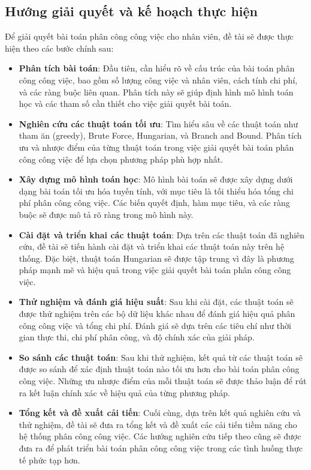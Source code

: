 \subsection{Hướng giải quyết và kế hoạch thực hiện}
Để giải quyết bài toán phân công công việc cho nhân viên, đề tài sẽ được thực hiện theo các bước chính sau:
\begin{itemize} 
    \item \textbf{Phân tích bài toán}: Đầu tiên, cần hiểu rõ về cấu trúc của bài toán phân công công việc, bao gồm số lượng công việc và nhân viên, cách tính chi phí, và các ràng buộc liên quan. Phân tích này sẽ giúp định hình mô hình toán học và các tham số cần thiết cho việc giải quyết bài toán.
     
    \item \textbf{Nghiên cứu các thuật toán tối ưu}: Tìm hiểu sâu về các thuật toán như tham ăn (greedy), Brute Force, Hungarian, và Branch and Bound. Phân tích ưu và nhược điểm của từng thuật toán trong việc giải quyết bài toán phân công công việc để lựa chọn phương pháp phù hợp nhất.

    \item \textbf{Xây dựng mô hình toán học}: Mô hình bài toán sẽ được xây dựng dưới dạng bài toán tối ưu hóa tuyến tính, với mục tiêu là tối thiểu hóa tổng chi phí phân công công việc. Các biến quyết định, hàm mục tiêu, và các ràng buộc sẽ được mô tả rõ ràng trong mô hình này.
    
    \item \textbf{Cài đặt và triển khai các thuật toán}: Dựa trên các thuật toán đã nghiên cứu, đề tài sẽ tiến hành cài đặt và triển khai các thuật toán này trên hệ thống. Đặc biệt, thuật toán Hungarian sẽ được tập trung vì đây là phương pháp mạnh mẽ và hiệu quả trong việc giải quyết bài toán phân công công việc.
    
    \item \textbf{Thử nghiệm và đánh giá hiệu suất}: Sau khi cài đặt, các thuật toán sẽ được thử nghiệm trên các bộ dữ liệu khác nhau để đánh giá hiệu quả phân công công việc và tổng chi phí. Đánh giá sẽ dựa trên các tiêu chí như thời gian thực thi, chi phí phân công, và độ chính xác của giải pháp.
    
    \item \textbf{So sánh các thuật toán}: Sau khi thử nghiệm, kết quả từ các thuật toán sẽ được so sánh để xác định thuật toán nào tối ưu hơn cho bài toán phân công công việc. Những ưu nhược điểm của mỗi thuật toán sẽ được thảo luận để rút ra kết luận chính xác về hiệu quả của từng phương pháp.
    
    \item \textbf{Tổng kết và đề xuất cải tiến}: Cuối cùng, dựa trên kết quả nghiên cứu và thử nghiệm, đề tài sẽ đưa ra tổng kết và đề xuất các cải tiến tiềm năng cho hệ thống phân công công việc. Các hướng nghiên cứu tiếp theo cũng sẽ được đưa ra để phát triển bài toán phân công công việc trong các tình huống thực tế phức tạp hơn.
\end{itemize}

